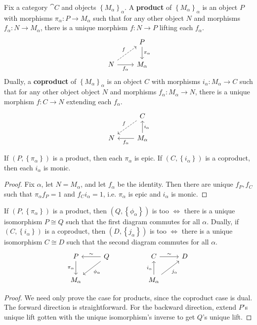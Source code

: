 \documentclass[twoside,10pt]{report}
\begin{document}
\begin{defn}[]
Fix a category $\cat{C}$ and objects $\left\{ M_{\alpha} \right\}_{\alpha}$. A \textbf{product} of $\left\{ M_{\alpha} \right\}_{\alpha}$ is an object $P$ with morphisms $\pi_{\alpha}:P\to M_{\alpha}$ such that for any other object $N$ and morphisms $f_{\alpha}:N\to M_{\alpha}$, there is a unique morphism $f:N\to P$ lifting each $f_{\alpha}$.
\[
\begin{tikzcd}
	& P \dar{\pi_{\alpha}} \\
	N \arrow[ur,dashed,"f"]\rar["f_{\alpha}"'] & M_{\alpha}
\end{tikzcd}
\] 
Dually, a \textbf{coproduct} of $\left\{ M_{\alpha} \right\}_{\alpha}$ is an object $C$ with morphisms $i_{\alpha}:M_{\alpha}\to C$ such that for any other object object $N$ and morphisms $f_{\alpha}:M_{\alpha}\to N$, there is a unique morphism $f:C\to N$ extending each $f_{\alpha}$.
\[
\begin{tikzcd}
	& C \arrow[dl,dashed,"f"'] \\
	N & M_{\alpha} \lar{f_{\alpha}}\uar["i_{\alpha}"']
\end{tikzcd}
\] 
\end{defn}

\begin{prop}
	If $(P, \left\{ \pi_{\alpha} \right\})$ is a product, then each $\pi_{\alpha}$ is epic. If $(C, \left\{ i_{\alpha} \right\})$ is a coproduct, then each $i_{\alpha}$ is monic.
\end{prop}
\begin{proof}
	Fix $\alpha$, let $N=M_{\alpha}$, and let $f_{\alpha}$ be the identity. Then there are unique $f_{P}, f_{C}$ such that $\pi_{\alpha}f_P=1$ and $f_C i_{\alpha}=1$, i.e. $\pi_{\alpha}$ is epic and $i_{\alpha}$ is monic.
\end{proof}

\begin{thrm}[Uniqueness]
	If $(P, \left\{ \pi_{\alpha} \right\})$ is a product, then $(Q, \left\{ \phi_{\alpha} \right\})$ is too $\iff$ there is a unique isomorphism $P \cong Q$ such that the first diagram commutes for all $\alpha$. Dually, if $(C, \left\{ i_{\alpha} \right\})$ is a coproduct, then $(D, \left\{ j_{\alpha} \right\})$ is too $\iff$ there is a unique isomorphism $C \cong D$ such that the second diagram commutes for all $\alpha$.
	\[
	\begin{tikzcd}
		P \dar["\pi_{\alpha}"'] & Q \lar["\sim"']\arrow[dl,"\phi_{\alpha}"] & & C \rar{\sim} & D \\
		M_{\alpha} & & & M_{\alpha} \uar{i_{\alpha}}\arrow[ur, "j_{\alpha}"']
	\end{tikzcd}
	\] 
\end{thrm}
\begin{proof}
	We need only prove the case for products, since the coproduct case is dual. The forward direction is straightforward. For the backward direction, extend $P$'s unique lift gotten with the unique isomorphism's inverse to get $Q$'s unique lift.
\end{proof}
\end{document}
